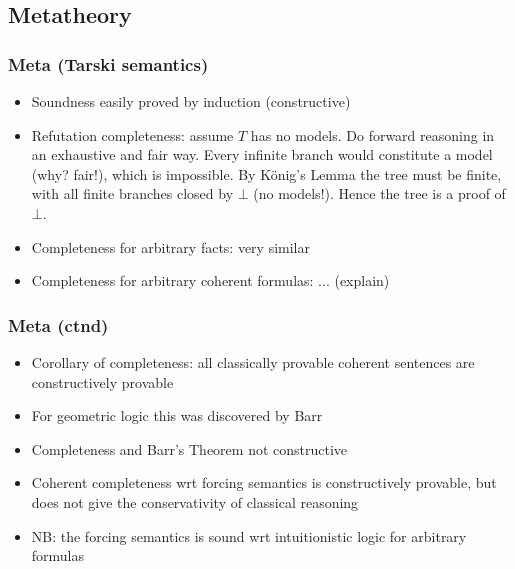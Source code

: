 \documentclass[handout,11pt]{beamer}
\begin{document}
\subsection{Metatheory}

\begin{frame}
\frametitle{Meta (Tarski semantics)}
 \begin{itemize}[<+->]   %
    \item Soundness easily proved by induction (constructive)
    \item Refutation completeness: assume $T$ has no models. Do forward reasoning in
an exhaustive and fair way. Every infinite branch would constitute
a model (why? fair!), which is impossible. By K\"onig's Lemma the tree must be finite,
with all finite branches closed by $\bot$ (no models!). Hence the tree is a proof of 
$\bot$.  
    \item Completeness for arbitrary facts: very similar
    \item Completeness for arbitrary coherent formulas: ... (explain)
 \end{itemize}
\end{frame}

\begin{frame}
\frametitle{Meta (ctnd)}
 \begin{itemize}[<+->]   %
    \item Corollary of completeness: 
    all classically provable coherent sentences are constructively provable
    \item For \alert{geometric} logic this was discovered by Barr
    \item Completeness and Barr's Theorem \alert{not constructive}
    \item Coherent completeness wrt forcing semantics is constructively
         provable, but does not give the conservativity of classical reasoning
    \item NB: the forcing semantics is sound wrt intuitionistic logic for arbitrary formulas
 \end{itemize}
\end{frame}
\end{document}

